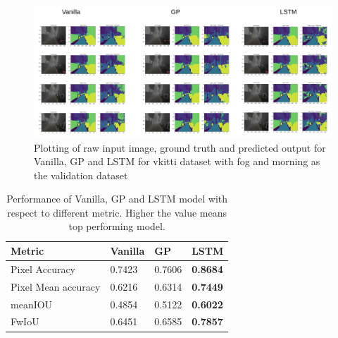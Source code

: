 	\begin{figure}[h]
		\centering
		\includegraphics[width=17cm]{images/unet_vkitti_two.png}
		\caption{Plotting of raw input image, ground truth and predicted output for Vanilla, GP and LSTM for vkitti dataset with fog and morning as the validation dataset}
		\label{fig:vkitti_unet_two}
	\end{figure}

	\begin{table}
		\begin{center}
			\begin{tabular}{ | l | p{4cm} | p{4cm} | p{4cm} |}
				\hline
				
				\cellcolor{purple!30}Metric & \cellcolor{purple!30}Vanilla & \cellcolor{purple!30}GP & \cellcolor{purple!30}LSTM\\ \hline
				
				Pixel Accuracy & 0.7423 & 0.7606 & {\bf 0.8684}  \\ \hline 
				Pixel Mean accuracy & 0.6216 & 0.6314 & { \bf 0.7449} \\ \hline
				meanIOU & 0.4854 & 0.5122 & { \bf 0.6022}  \\ \hline
				FwIoU & 0.6451 & 0.6585 & { \bf 0.7857} \\ \hline
				\hline
			\end{tabular}
			\caption{Performance of Vanilla, GP and LSTM model with respect to different metric. Higher the value means top performing model.}
			\label{table:unet_vkitti_two_classes}
		\end{center}
	\end{table}
	
